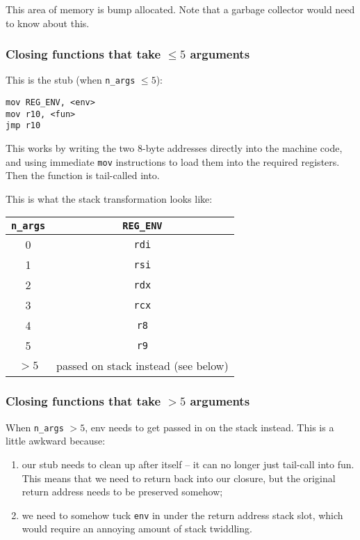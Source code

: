 \documentclass[12pt,a4paper,twoside,openright]{report}
\begin{document}
This area of memory is bump allocated. Note that a garbage collector would need to know about this.

\subsubsection{Closing functions that take $\le 5$ arguments}

This is the stub (when \lstinline{n_args} $\le 5$):

\begin{lstlisting}
mov REG_ENV, <env>
mov r10, <fun>
jmp r10
\end{lstlisting}

This works by writing the two 8-byte addresses directly into the machine code, and using immediate \lstinline{mov} instructions to load them into the required registers. Then the function is tail-called into.

This is what the stack transformation looks like: %

\begin{tabular}{ c | c }
  \lstinline!n_args! & \lstinline!REG_ENV! \\
  \hline
  0 & \lstinline!rdi! \\
  1 & \lstinline!rsi! \\
  2 & \lstinline!rdx! \\
  3 & \lstinline!rcx! \\
  4 & \lstinline!r8! \\
  5 & \lstinline!r9! \\
  $> 5$ & passed on stack instead (see below) \\
\end{tabular}

\subsubsection{Closing functions that take $> 5$ arguments}

When \lstinline{n_args} $> 5$, env needs to get passed in on the stack instead.
This is a little awkward because:
\begin{enumerate}
  \item our stub needs to clean up after itself -- it can no longer just tail-call into fun. This means that we need to return back into our closure, but the original return address needs to be preserved somehow;
  \item we need to somehow tuck \lstinline{env} in under the return address stack slot, which would require an annoying amount of stack twiddling.
\end{enumerate}
\end{document}
